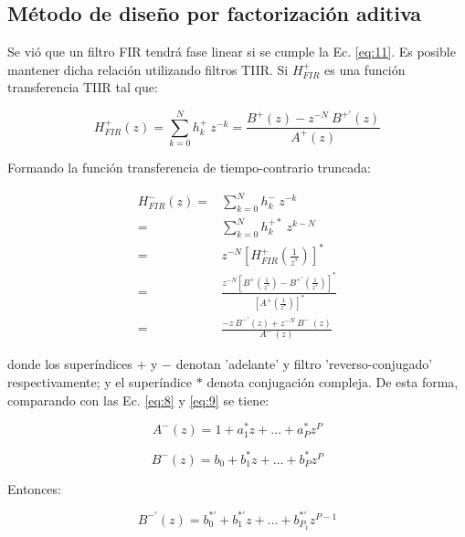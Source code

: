 \subsection{Método de diseño por factorización aditiva}
    Se vió que un filtro FIR tendrá fase linear si se cumple la Ec. \ref{eq:11}. Es posible mantener dicha relación utilizando filtros TIIR. Si $H_{FIR}^{+}$ es una función transferencia TIIR tal que:

    \begin{equation}
      H_{FIR}^{+}(z) = \sum_{k=0}^{N} {h_{k}^{+} \: z^{-k}} = \frac{B^{+}(z) - z^{-N} \: B^{+\prime} (z)}{A^{+} (z)}
      \label{eq:42}
    \end{equation}

    Formando la función transferencia de tiempo-contrario truncada:

    \begin{align}
      H_{FIR}^{-} (z) =& \sum_{k=0}^{N} {h_{k}^{-} \: z^{-k}} \\
      =& \sum_{k=0}^{N} {h_{k}^{+*} \: z^{k-N}} \\
      =& z^{-N} \left[ H_{FIR}^{ +} \left( \frac{1}{z^{*}} \right) \right] ^{*} \\
      =& \frac{z^{-N} \left[ B^{+} \left( \frac{1}{z^{*}} \right) - B^{+\prime} \left( \frac{1}{z^{*}} \right) \right] ^{*}}{\left[ A^{ + } \left( \frac{1}{z^{*}} \right) \right] ^{*}} \\
      =& \frac{-z \: B^{-\prime} (z) + z^{-N} \: B^{-} \: (z) }{A^{-} \: (z)}
      \label{eq:47}
    \end{align}

    donde los superíndices $+$ y $-$ denotan 'adelante' y filtro 'reverso-conjugado' respectivamente; y el superíndice $*$ denota conjugación compleja. De esta forma, comparando con las Ec. \ref{eq:8} y \ref{eq:9} se tiene:

    \begin{equation}
      A^{-}(z) = 1 + a^{*}_1 z + \ldots + a^{*}_P z^P
    \end{equation}

    \begin{equation}
      B^{-}(z) = b_0 + b^{*}_1 z + \ldots + b^{*}_P z^P
    \end{equation}

    Entonces:

    \begin{equation}
      B^{-\prime}(z) = b_0^{*\prime} + b_1^{*\prime} z + \ldots + b_{P_1}^{*\prime} z^{P-1}
    \end{equation}

